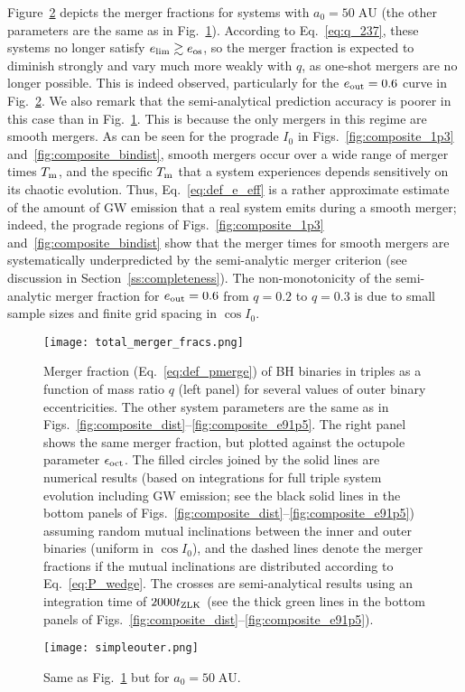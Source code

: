\documentclass[
        fleqn,
        usenatbib,
    ]{mnras}
\begin{document}
Figure~\ref{fig:sweepbin_simpleouter} depicts the merger fractions for systems
with $a_0 = 50\;\mathrm{AU}$ (the other parameters are the same as in
Fig.~\ref{fig:total_merger_fracs}). According to Eq.~\eqref{eq:q_237}, these
systems no longer satisfy $e_{\lim} \gtrsim e_{\rm os}$, so the
merger fraction is expected to diminish strongly and vary much more weakly with
$q$, as one-shot mergers are no longer possible. This is indeed observed,
particularly for the $e_{\rm out} = 0.6$ curve in
Fig.~\ref{fig:sweepbin_simpleouter}. We also remark that the
semi-analytical prediction accuracy is poorer in this case than in
Fig.~\ref{fig:total_merger_fracs}. This is because the only mergers in this
regime are smooth mergers. As can be seen for the prograde $I_0$ in
Figs.~\ref{fig:composite_1p3} and~\ref{fig:composite_bindist}, smooth mergers
occur over a wide range of merger times $T_{\rm m}$, and the specific $T_{\rm
m}$ that a system experiences depends sensitively on its chaotic evolution.
Thus, Eq.~\eqref{eq:def_e_eff} is a rather approximate estimate of the amount of
GW emission that a real system emits during a smooth merger; indeed, the
prograde regions of Figs.~\ref{fig:composite_1p3}
and~\ref{fig:composite_bindist} show that the merger times for smooth mergers
are systematically underpredicted by the semi-analytic merger criterion (see
discussion in Section~\ref{ss:completeness}). The non-monotonicity of the
semi-analytic merger fraction for $e_{\rm out} = 0.6$ from $q = 0.2$ to $q =
0.3$ is due to small sample sizes and finite grid spacing in $\cos I_0$.

\begin{figure*}
    \centering
    \texttt{[image: total\_merger\_fracs.png]}
    \caption{Merger fraction (Eq.~\ref{eq:def_pmerge}) of BH binaries in
    triples as a function of mass ratio $q$ (left panel) for several values of
    outer binary eccentricities. The other system parameters are the same as in
    Figs.~\ref{fig:composite_dist}--\ref{fig:composite_e91p5}. The right panel
    shows the same merger fraction, but plotted against the octupole parameter
    $\epsilon_{\rm oct}$.  The filled circles joined by the solid lines are
    numerical results (based on integrations for full triple system evolution
    including GW emission; see the black solid lines in the bottom panels of
    Figs.~\ref{fig:composite_dist}--\ref{fig:composite_e91p5})
    assuming random mutual inclinations between the inner and
    outer binaries (uniform in $\cos I_0$), and the dashed lines denote the
    merger fractions if the mutual inclinations are distributed according to
    Eq.~\eqref{eq:P_wedge}. The crosses are semi-analytical
    results using an integration time of $2000 t_{\rm ZLK}$ (see the thick green
    lines in the bottom panels of
    Figs.~\ref{fig:composite_dist}--\ref{fig:composite_e91p5}).
    }\label{fig:total_merger_fracs}
\end{figure*}
\begin{figure*}
    \centering
    \texttt{[image: simpleouter.png]}
    \caption{Same as Fig.~\ref{fig:total_merger_fracs} but for $a_0 =
    50\;\mathrm{AU}$.}\label{fig:sweepbin_simpleouter}
\end{figure*}
\end{document}
